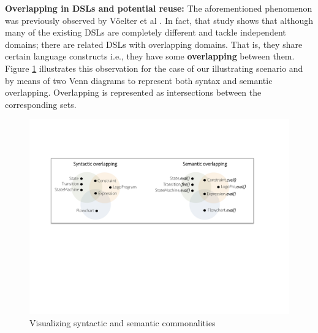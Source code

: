 
\textbf{Overlapping in DSLs and potential reuse:} The aforementioned phenomenon was previously observed by V\"oelter et al \cite[p. 60-61]{voelter:2013}. In fact, that study shows that although many of the existing DSLs are completely different and tackle independent domains; there are related DSLs with overlapping domains. That is, they share certain language constructs i.e., they have some \textbf{overlapping} between them. Figure \ref{fig:shape} illustrates this observation for the case of our illustrating scenario and by means of two Venn diagrams to represent both syntax and semantic overlapping. Overlapping is represented as intersections between the corresponding sets. 

\begin{figure}
\centering
\includegraphics[width=1\linewidth]{images/domains-inaction.pdf}
\caption{Visualizing syntactic and semantic commonalities}
\label{fig:shape}
\end{figure}

